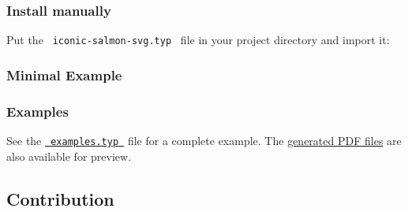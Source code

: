 \begin{Shaded}
\begin{Highlighting}[]
\end{Highlighting}
\end{Shaded}

\subsubsection{Install manually}\label{install-manually}

Put the \texttt{\ iconic-salmon-svg.typ\ } file in your project
directory and import it:

\begin{Shaded}
\begin{Highlighting}[]
\end{Highlighting}
\end{Shaded}

\subsubsection{Minimal Example}\label{minimal-example}

\begin{Shaded}
\begin{Highlighting}[]

\end{Highlighting}
\end{Shaded}

\subsubsection{Examples}\label{examples}

See the
\href{https://github.com/typst/packages/raw/main/packages/preview/iconic-salmon-svg/1.1.0/examples/examples.typ}{\texttt{\ examples.typ\ }}
file for a complete example. The
\href{https://github.com/typst/packages/raw/main/packages/preview/iconic-salmon-svg/1.1.0/examples/}{generated
PDF files} are also available for preview.

\subsection{Contribution}\label{contribution}

